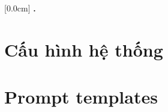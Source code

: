 \documentclass[a4paper,13pt,3p,twoside]{report}
\theoremstyle{definition}
\begin{document}
    [0.0cm]
    {\bfseries\vspace{0.3cm}}
    {{\bfseries{\scshape} \thecontentslabel.\ }}
    {}
    {\contentspage}

\chapter{Cấu hình hệ thống}


\newpage
\chapter{Prompt templates}


% 

% 

% 
\end{document}

